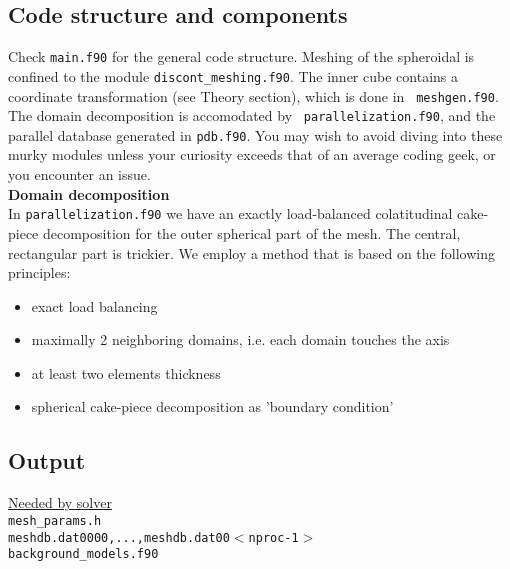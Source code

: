\documentclass[11pt,letter,fleqn,english,notitlepage]{article}
\begin{document}
\subsection{Code structure and components}
Check {\tt main.f90} for the general code structure. Meshing of the spheroidal
is confined to the module {\tt discont\_meshing.f90}. The inner cube contains a
coordinate transformation (see Theory section), which is done in {\tt
meshgen.f90}. The domain decomposition is accomodated by {\tt
parallelization.f90}, and the parallel database generated in {\tt pdb.f90}. You
may wish to avoid diving into these murky modules unless your curiosity exceeds
that of an average coding geek, or you encounter an issue.\\

\noindent\textbf{Domain decomposition }\\
In {\tt parallelization.f90} we have an exactly load-balanced colatitudinal
cake-piece decomposition for the outer spherical part of the mesh. The central,
rectangular part is trickier. We employ a method that is based on the
following principles:

\begin{itemize}
    \item exact load balancing 
    \item maximally 2 neighboring domains, i.e. each domain touches the axis
    \item at least two elements thickness
    \item spherical cake-piece decomposition as 'boundary condition'
\end{itemize}



\subsection{Output}
\underline{Needed by solver} \\
{\tt mesh\_params.h}\\
{\tt meshdb.dat0000,...,meshdb.dat00$<$nproc-1$>$}\\
{\tt background\_models.f90}\\
\end{document}
